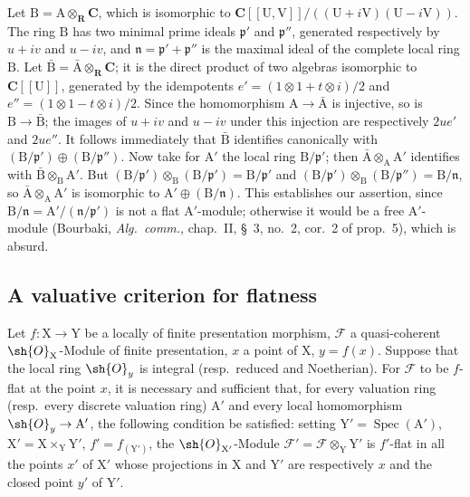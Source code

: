 \begin{env}[11.7.5]
Let $\mathrm{B}=\mathrm{A}\otimes_\mathbf{R}\mathbf{C}$, which is isomorphic to $\mathbf{C}[[\mathrm{U},\mathrm{V}]]/((\mathrm{U}+i\mathrm{V})(\mathrm{U}-i\mathrm{V}))$.
The ring $\mathrm{B}$ has two minimal prime ideals $\mathfrak{p}'$ and $\mathfrak{p}''$, generated respectively by $u+iv$ and $u-iv$, and $\mathfrak{n}=\mathfrak{p}'+\mathfrak{p}''$ is the maximal ideal of the complete local ring $\mathrm{B}$.
Let $\bar{\mathrm{B}}=\bar{\mathrm{A}}\otimes_\mathbf{R}\mathbf{C}$; it is the direct product of two algebras isomorphic to $\mathbf{C}[[\mathrm{U}]]$, generated by the idempotents $e'=(1\otimes 1+t\otimes i)/2$ and $e''=(1\otimes 1-t\otimes i)/2$.
Since the homomorphism $\mathrm{A}\to\bar{\mathrm{A}}$ is injective, so is $\mathrm{B}\to\bar{\mathrm{B}}$; the images of $u+iv$ and $u-iv$ under this injection are respectively $2ue'$ and $2ue''$.
It follows immediately that $\bar{\mathrm{B}}$ identifies canonically with $(\mathrm{B}/\mathfrak{p}')\oplus(\mathrm{B}/\mathfrak{p}'')$.
Now take for $\mathrm{A}'$ the local ring $\mathrm{B}/\mathfrak{p}'$; then $\bar{\mathrm{A}}\otimes_\mathrm{A}\mathrm{A}'$ identifies with $\bar{\mathrm{B}}\otimes_\mathrm{B}\mathrm{A}'$.
But $(\mathrm{B}/\mathfrak{p}')\otimes_\mathrm{B}(\mathrm{B}/\mathfrak{p}')=\mathrm{B}/\mathfrak{p}'$ and $(\mathrm{B}/\mathfrak{p}')\otimes_\mathrm{B}(\mathrm{B}/\mathfrak{p}'')=\mathrm{B}/\mathfrak{n}$, so $\bar{\mathrm{A}}\otimes_\mathrm{A}\mathrm{A}'$ is isomorphic to $\mathrm{A}'\oplus(\mathrm{B}/\mathfrak{n})$.
This establishes our assertion, since $\mathrm{B}/\mathfrak{n}=\mathrm{A}'/(\mathfrak{n}/\mathfrak{p}')$ is not a flat $\mathrm{A}'$-module; otherwise it would be a free $\mathrm{A}'$-module (Bourbaki, \emph{Alg.\ comm.}, chap.~II, \S~3, no.~2, cor.~2 of prop.~5), which is absurd.
\end{env}

\subsection{A valuative criterion for flatness}
\label{subsection:IV.11.8}

\begin{theorem}[11.8.1]
\label{IV.11.8.1}
Let $f:\mathrm{X}\to\mathrm{Y}$ be a locally of finite presentation morphism, $\mathscr{F}$ a quasi-coherent $\sh{O}_\mathrm{X}$-Module of finite presentation, $x$ a point of $\mathrm{X}$, $y=f(x)$.
Suppose that the local ring $\sh{O}_y$ is integral (resp.\ reduced and Noetherian).
For $\mathscr{F}$ to be $f$-flat at the point $x$, it is necessary and sufficient that, for every valuation ring (resp.\ every discrete valuation ring) $\mathrm{A}'$ and every local homomorphism $\sh{O}_y\to\mathrm{A}'$, the following condition be satisfied: setting $\mathrm{Y}'=\operatorname{Spec}(\mathrm{A}')$, $\mathrm{X}'=\mathrm{X}\times_\mathrm{Y}\mathrm{Y}'$, $f'=f_{(\mathrm{Y}')}$, the $\sh{O}_{\mathrm{X}'}$-Module $\mathscr{F}'=\mathscr{F}\otimes_\mathrm{Y}\mathrm{Y}'$ is $f'$-flat in all the points $x'$ of $\mathrm{X}'$ whose projections in $\mathrm{X}$ and $\mathrm{Y}'$ are respectively $x$ and the closed point $y'$ of $\mathrm{Y}'$.
\end{theorem}

